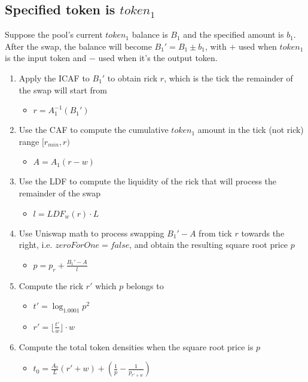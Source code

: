\documentclass[twocolumn]{article}
\begin{document}
\subsection{Specified token is $token_1$}

Suppose the pool's current $token_1$ balance is $B_1$ and the specified amount is $b_1$. After the swap, the balance will become $B_1' = B_1 \pm b_1$, with $+$ used when $token_1$ is the input token and $-$ used when it's the output token.

\begin{enumerate}
  \item Apply the ICAF to $B_1'$ to obtain rick $r$, which is the tick the remainder of the swap will start from
    \begin{itemize}
      \item $r = A_1^{-1}(B_1')$  
    \end{itemize}
  \item Use the CAF to compute the cumulative $token_1$ amount in the tick (not rick) range $[r_{min}, r)$
    \begin{itemize} 
      \item $A = A_1(r - w)$
    \end{itemize}
  \item Use the LDF to compute the liquidity of the rick that will process the remainder of the swap 
    \begin{itemize}
      \item $l = LDF_w(r) \cdot L$  
    \end{itemize}
  \item Use Uniswap math to process swapping $B_1' - A$ from tick $r$ towards the right, i.e. $zeroForOne = false$, and obtain the resulting square root price $p$
    \begin{itemize}
      \item $p = p_r + \frac{B_1' - A}{l}$
    \end{itemize} 
  \item Compute the rick $r'$ which $p$ belongs to
    \begin{itemize} 
      \item $t' = \log_{1.0001} p^2$
      \item $r' = \lfloor \frac{t'}{w} \rfloor \cdot w$
    \end{itemize}
  \item Compute the total token densities when the square root price is $p$
    \begin{itemize}
      \item $t_0=\frac{A_0}{L}(r'+w) + (\frac{1}{p}-\frac{1}{p_{r'+w}})$

\end{itemize}
\end{enumerate}
\end{document}
